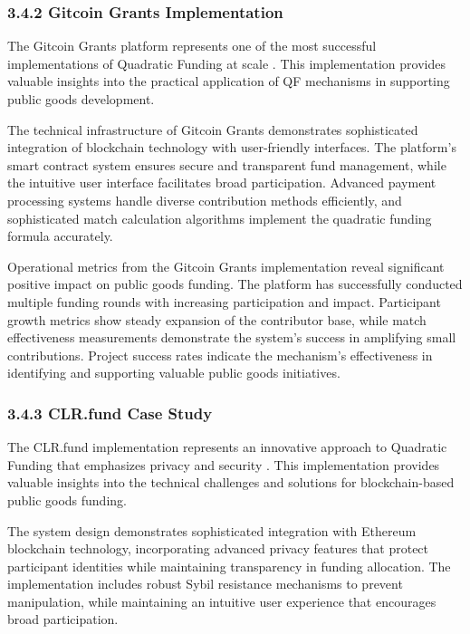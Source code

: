 \hypertarget{gitcoin-grants-implementation}{%
\subsubsection{3.4.2 Gitcoin Grants Implementation}\label{gitcoin-grants-implementation}}

The Gitcoin Grants platform represents one of the most successful implementations of Quadratic Funding at scale \citep{gitcoingrants2024}. This implementation provides valuable insights into the practical application of QF mechanisms in supporting public goods development.

The technical infrastructure of Gitcoin Grants demonstrates sophisticated integration of blockchain technology with user-friendly interfaces. The platform's smart contract system ensures secure and transparent fund management, while the intuitive user interface facilitates broad participation. Advanced payment processing systems handle diverse contribution methods efficiently, and sophisticated match calculation algorithms implement the quadratic funding formula accurately.

Operational metrics from the Gitcoin Grants implementation reveal significant positive impact on public goods funding. The platform has successfully conducted multiple funding rounds with increasing participation and impact. Participant growth metrics show steady expansion of the contributor base, while match effectiveness measurements demonstrate the system's success in amplifying small contributions. Project success rates indicate the mechanism's effectiveness in identifying and supporting valuable public goods initiatives.

\hypertarget{clr.fund-case-study}{%
\subsubsection{3.4.3 CLR.fund Case Study}\label{clr.fund-case-study}}

The CLR.fund implementation represents an innovative approach to Quadratic Funding that emphasizes privacy and security \citep{buterin2019flexible}. This implementation provides valuable insights into the technical challenges and solutions for blockchain-based public goods funding.

The system design demonstrates sophisticated integration with Ethereum blockchain technology, incorporating advanced privacy features that protect participant identities while maintaining transparency in funding allocation. The implementation includes robust Sybil resistance mechanisms to prevent manipulation, while maintaining an intuitive user experience that encourages broad participation.

